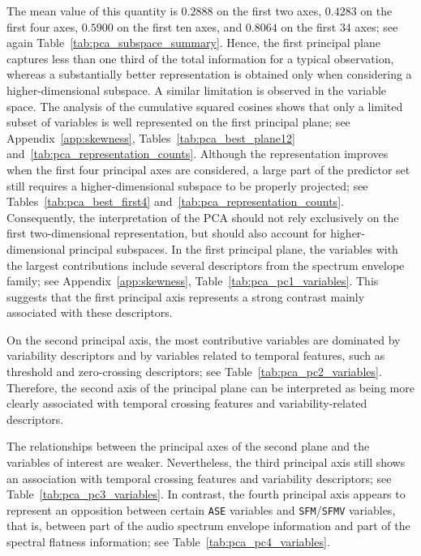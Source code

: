 The mean value of this quantity is \(0.2888\) on the first two axes, \(0.4283\) on the first four axes, \(0.5900\) on the first ten axes, and \(0.8064\) on the first \(34\) axes; see again Table~\ref{tab:pca_subspace_summary}. Hence, the first principal plane captures less than one third of the total information for a typical observation, whereas a substantially better representation is obtained only when considering a higher-dimensional subspace. A similar limitation is observed in the variable space. The analysis of the cumulative squared cosines shows that only a limited subset of variables is well represented on the first principal plane; see Appendix~\ref{app:skewness}, Tables~\ref{tab:pca_best_plane12} and~\ref{tab:pca_representation_counts}. Although the representation improves when the first four principal axes are considered, a large part of the predictor set still requires a higher-dimensional subspace to be properly projected; see Tables~\ref{tab:pca_best_first4} and~\ref{tab:pca_representation_counts}. Consequently, the interpretation of the PCA should not rely exclusively on the first two-dimensional representation, but should also account for higher-dimensional principal subspaces.
In the first principal plane, the variables with the largest contributions include several descriptors from the spectrum envelope family; see Appendix~\ref{app:skewness}, Table~\ref{tab:pca_pc1_variables}. This suggests that the first principal axis represents a strong contrast mainly associated with these descriptors.

On the second principal axis, the most contributive variables are dominated by variability descriptors and by variables related to temporal features, such as threshold and zero-crossing descriptors; see Table~\ref{tab:pca_pc2_variables}. Therefore, the second axis of the principal plane can be interpreted as being more clearly associated with temporal crossing features and variability-related descriptors.

The relationships between the principal axes of the second plane and the variables of interest are weaker. Nevertheless, the third principal axis still shows an association with temporal crossing features and variability descriptors; see Table~\ref{tab:pca_pc3_variables}. In contrast, the fourth principal axis appears to represent an opposition between certain \texttt{ASE} variables and \texttt{SFM}/\texttt{SFMV} variables, that is, between part of the audio spectrum envelope information and part of the spectral flatness information; see Table~\ref{tab:pca_pc4_variables}.

